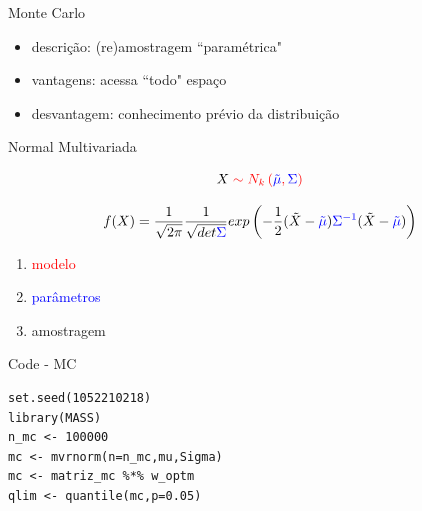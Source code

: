 \documentclass{beamer}
\begin{document}
\begin{frame}{Monte Carlo}

\begin{itemize}
\item descrição: (re)amostragem ``paramétrica"
\item vantagens: acessa ``todo" espaço
\item desvantagem: conhecimento prévio da distribuição
\end{itemize}

\end{frame}


\begin{frame}{Normal Multivariada}

\begin{equation*}
X \color{red}\sim N_k\left(\color{blue}\tilde{\mu}\color{red},\color{blue}\Sigma\color{red}\right)
\end{equation*}



\begin{equation*}
f(X) = \frac{1}{\sqrt{2\pi}}\frac{1}{\sqrt{det \color{blue}\Sigma}}exp\left(-\frac{1}{2}(\tilde{X}-\color{blue}\tilde{\mu}\color{black})\color{blue}\Sigma^{-1}\color{black}(\tilde{X}-\color{blue}\tilde{\mu}\color{black})\right)
\end{equation*}


\begin{enumerate}
\item \textcolor{red}{modelo}
\item \textcolor{blue}{parâmetros}
\item amostragem
\end{enumerate}


\end{frame}


\begin{frame}[fragile]{Code - MC}


\begin{verbatim}
set.seed(1052210218)
library(MASS)
n_mc <- 100000
mc <- mvrnorm(n=n_mc,mu,Sigma)
mc <- matriz_mc %*% w_optm
qlim <- quantile(mc,p=0.05)
   \end{verbatim}
\end{frame}
\end{document}
